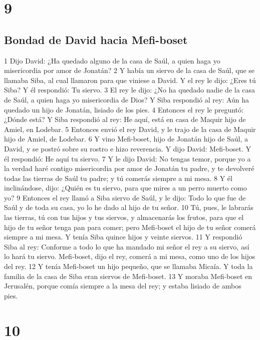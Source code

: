 \chapter{9}

\section*{Bondad de David hacia Mefi-boset}

1 Dijo David: ¿Ha quedado alguno de la casa de Saúl, a quien haga yo misericordia por amor de Jonatán? 
2 Y había un siervo de la casa de Saúl, que se llamaba Siba, al cual llamaron para que viniese a David. Y el rey le dijo: ¿Eres tú Siba? Y él respondió: Tu siervo.
3 El rey le dijo: ¿No ha quedado nadie de la casa de Saúl, a quien haga yo misericordia de Dios? Y Siba respondió al rey: Aún ha quedado un hijo de Jonatán, lisiado de los pies.
4 Entonces el rey le preguntó: ¿Dónde está? Y Siba respondió al rey: He aquí, está en casa de Maquir hijo de Amiel, en Lodebar.
5 Entonces envió el rey David, y le trajo de la casa de Maquir hijo de Amiel, de Lodebar.
6 Y vino Mefi-boset, hijo de Jonatán hijo de Saúl, a David, y se postró sobre su rostro e hizo reverencia. Y dijo David: Mefi-boset. Y él respondió: He aquí tu siervo.
7 Y le dijo David: No tengas temor, porque yo a la verdad haré contigo misericordia por amor de Jonatán tu padre, y te devolveré todas las tierras de Saúl tu padre; y tú comerás siempre a mi mesa.
8 Y él inclinándose, dijo: ¿Quién es tu siervo, para que mires a un perro muerto como yo?
9 Entonces el rey llamó a Siba siervo de Saúl, y le dijo: Todo lo que fue de Saúl y de toda su casa, yo lo he dado al hijo de tu señor.
10 Tú, pues, le labrarás las tierras, tú con tus hijos y tus siervos, y almacenarás los frutos, para que el hijo de tu señor tenga pan para comer; pero Mefi-boset el hijo de tu señor comerá siempre a mi mesa. Y tenía Siba quince hijos y veinte siervos.
11 Y respondió Siba al rey: Conforme a todo lo que ha mandado mi señor el rey a su siervo, así lo hará tu siervo. Mefi-boset, dijo el rey, comerá a mi mesa, como uno de los hijos del rey.
12 Y tenía Mefi-boset un hijo pequeño, que se llamaba Micaía. Y toda la familia de la casa de Siba eran siervos de Mefi-boset.
13 Y moraba Mefi-boset en Jerusalén, porque comía siempre a la mesa del rey; y estaba lisiado de ambos pies.

\chapter{10}

